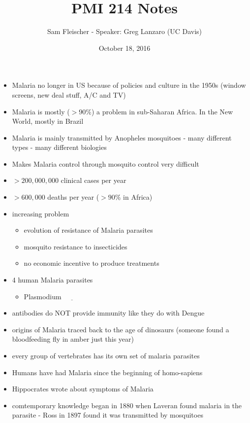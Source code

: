 \documentclass{article}
\title{PMI 214 Notes}
\author{Sam Fleischer - Speaker: Greg Lanzaro (UC Davis)}
\date{October 18, 2016}
\begin{document}
    \maketitle

    \begin{itemize}
        \item Malaria no longer in US because of policies and culture in the 1950s (window screens, new deal stuff, A/C and TV)
        \item Malaria is mostly ($>90\%$) a problem in sub-Saharan Africa.  In the New World, mostly in Brazil
        \item Malaria is mainly transmitted by Anopheles mosquitoes - many different types - many different biologies
        \item Makes Malaria control through mosquito control very difficult
        \item $>200,000,000$ clinical cases per year
        \item $>600,000$ deaths per year ($>90\%$ in Africa)
        \item increasing problem
        \begin{itemize}
            \item evolution of resistance of Malaria parasites
            \item mosquito resistance to insecticides
            \item no economic incentive to produce treatments
        \end{itemize}
        \item 4 human Malaria parasites
        \begin{itemize}
            \item Plasmodium $\underline{\hspace{1cm}}$
        \end{itemize}
        \item antibodies do NOT provide immunity like they do with Dengue
        \item origins of Malaria traced back to the age of dinosaurs (someone found a bloodfeeding fly in amber just this year)
        \item every group of vertebrates has its own set of malaria parasites
        \item Humans have had Malaria since the beginning of homo-sapiens
        \item Hippocrates wrote about symptoms of Malaria
        \item comtemporary knowledge began in 1880 when Laveran found malaria in the parasite - Ross in 1897 found it was transmitted by mosquitoes

\end{itemize}
\end{document}
